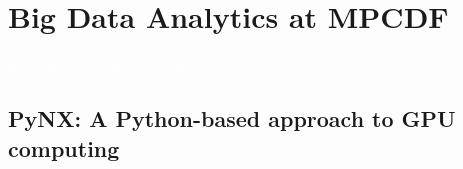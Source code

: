 \documentclass[]{beamer}
\begin{document}

\section{Big Data Analytics at MPCDF}
\begin{frame}[plain]
    \Huge{\centerline{\textcolor{white}{Big Data Analytics at the MPCDF}}}

\end{frame}
\subsection{PyNX: A Python-based approach to GPU computing} 
\end{document}
